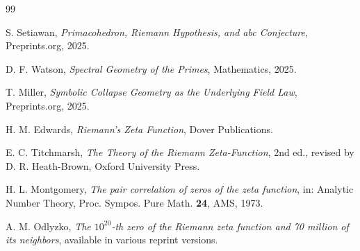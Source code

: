 \documentclass[11pt,a4paper]{amsart}
\theoremstyle{plain}
\theoremstyle{definition}
\theoremstyle{remark}
\begin{document}
	\begin{thebibliography}{99}
		
		S. Setiawan,
		\textit{Primacohedron, Riemann Hypothesis, and abc Conjecture},
		Preprints.org, 2025.
		
		D. F. Watson,
		\textit{Spectral Geometry of the Primes},
		Mathematics, 2025.
		
		T. Miller,
		\textit{Symbolic Collapse Geometry as the Underlying Field Law},
		Preprints.org, 2025.
		
		H. M. Edwards,
		\textit{Riemann's Zeta Function},
		Dover Publications.
		
		E. C. Titchmarsh,
		\textit{The Theory of the Riemann Zeta-Function},
		2nd ed., revised by D. R. Heath-Brown,
		Oxford University Press.
		
		H. L. Montgomery,
		\textit{The pair correlation of zeros of the zeta function},
		in: Analytic Number Theory, Proc. Sympos. Pure Math. \textbf{24}, AMS, 1973.
		
		A. M. Odlyzko,
		\textit{The $10^{20}$-th zero of the Riemann zeta function and 70 million of its neighbors},
		available in various reprint versions.
		
	\end{thebibliography}
	
\end{document}
